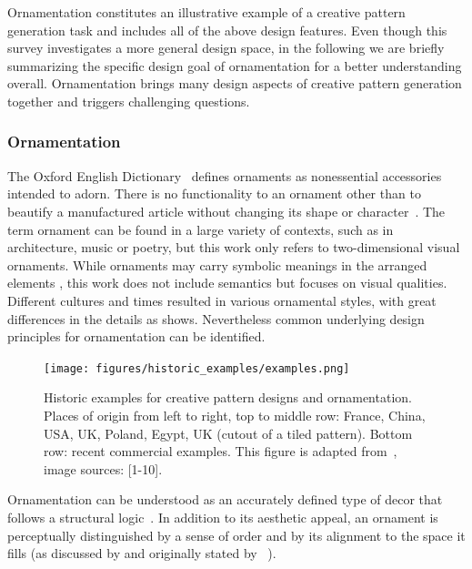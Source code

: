 Ornamentation constitutes an illustrative example of a creative pattern generation task and includes all of the above design features. Even though this survey investigates a more general design space, in the following we are briefly summarizing the specific design goal of ornamentation for a better understanding overall. Ornamentation brings many design aspects of creative pattern generation together and triggers challenging questions. 

\subsubsection{Ornamentation}
\label{subsubsec:ornamentation}



The Oxford English Dictionary~\cite{oed_2017} defines ornaments as nonessential accessories intended to adorn. There is no functionality to an ornament other than to beautify a manufactured article without changing its shape or character~\cite{ward_1896_tpo}. The term ornament can be found in a large variety of contexts, such as in architecture, music or poetry, but this work only refers to two-dimensional visual ornaments. While ornaments may carry symbolic meanings in the arranged elements \cite{wornum_1896_aof}, this work does not include semantics but focuses on visual qualities. Different cultures and times resulted in various ornamental styles, with great differences in the details as  shows. Nevertheless common underlying design principles for ornamentation can be identified.

\begin{figure}
       \texttt{[image: figures/historic\_examples/examples.png]}
        \caption[Historic pattern examples]{\label{fig:historic_examples} Historic examples for creative pattern designs and ornamentation. Places of origin from left to right, top to middle row:  France, China, USA, UK, Poland, Egypt, UK (cutout of a tiled pattern). Bottom row: recent commercial examples. This figure is adapted from~\cite{gieseke_2017_ooo}, image sources: [1-10].}
\end{figure}

Ornamentation can be understood as an accurately defined type of decor that follows a structural logic~\cite{ward_1896_tpo, moughtin_1999_udo, arbruzzo_2006_dec}. 
In addition to its aesthetic appeal, an ornament is perceptually distinguished by a sense of order and by its alignment to the space it fills (as discussed by \cite{wong_1998_cgf,gieseke_2017_ooo} and originally stated by \citeauthor*{ward_1896_tpo}~\cite{ward_1896_tpo, dresser_1875_pdd, arbruzzo_2006_dec}). 


